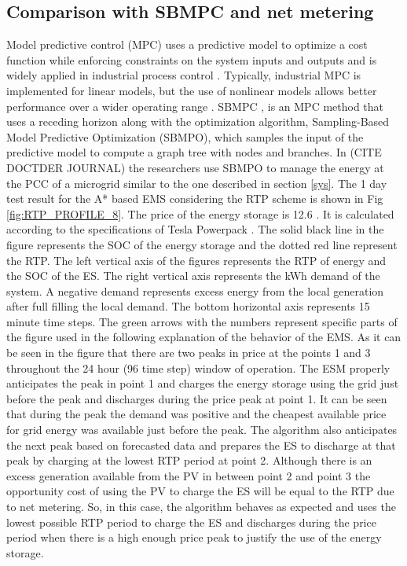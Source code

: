 \subsection{Comparison with SBMPC and net metering}
Model predictive control (MPC) uses a predictive model to optimize a cost function while enforcing constraints on the system inputs and outputs and is widely applied in industrial process control \cite{qin1997overview}. Typically, industrial MPC is implemented for linear models, but the use of nonlinear models allows better performance over a wider operating range \cite{berber2012nonlinear}. SBMPC \cite{dunlap2011book}, \cite{reese2016graph} is an MPC method that uses a receding horizon along with the optimization algorithm, Sampling-Based Model Predictive Optimization (SBMPO), which samples the input of the predictive model to compute a  graph tree with nodes and branches. In \colorbox{BurntOrange}{(CITE DOCTDER JOURNAL)} the researchers use SBMPO to manage the energy at the PCC of a microgrid similar to the one described in section \ref{sys}. The 1 day test result for the A* based EMS considering the RTP scheme is shown in Fig \ref{fig:RTP_PROFILE_8}. The price of the energy storage is 12.6 \cent. It is calculated according to the specifications of Tesla Powerpack \cite{tesla_powerpack_2018}. The solid black line in the figure represents the SOC of the energy storage and the dotted red line represent the RTP. The left vertical axis of the figures represents the RTP of energy and the SOC of the ES. The right vertical axis represents the kWh demand of the system. A negative demand represents excess energy from the local generation after full filling the local demand. The bottom horizontal axis represents 15 minute time steps. The green arrows with the numbers represent specific parts of the figure used in the following explanation of the behavior of the EMS. As it can be seen in the figure that there are two peaks in price at the points 1 and 3 throughout the 24 hour (96 time step) window of operation.  The ESM properly anticipates the peak in point 1 and charges the energy storage using the grid just before the peak and discharges during the price peak at point 1. It can be seen that during the peak the demand was positive and the cheapest available price for grid energy was available just before the peak. The algorithm also anticipates the next peak based on forecasted data and prepares the ES to discharge at that peak by charging at the lowest RTP period at point 2. Although there is an excess generation available from the PV in between point 2 and point 3 the opportunity cost of using the PV to charge the ES will be equal to the RTP due to net metering. So, in this case, the algorithm behaves as expected and uses the lowest possible RTP period to charge the ES and discharges during the price period when there is a high enough price peak to justify the use of the energy storage.
 
